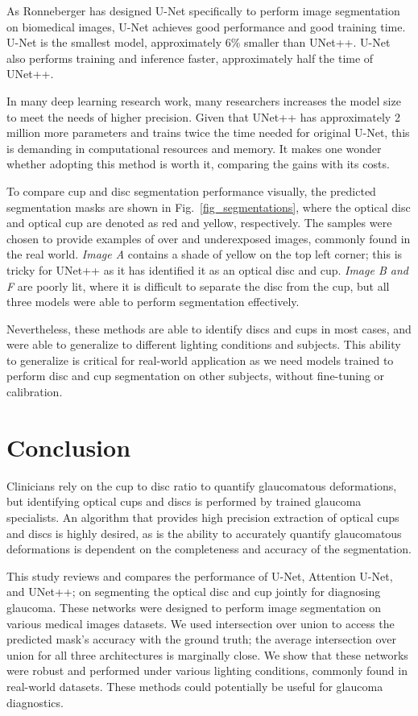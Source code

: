 \documentclass[conference]{IEEEtran}
\begin{document}
As Ronneberger has designed U-Net specifically to perform image segmentation on biomedical images, U-Net achieves good performance and good training time. U-Net is the smallest model, approximately 6\% smaller than UNet++. U-Net also performs training and inference faster, approximately half the time of UNet++.

In many deep learning research work, many researchers increases the model size to meet the needs of higher precision. Given that UNet++ has approximately 2 million more parameters and trains twice the time needed for original U-Net, this is demanding in computational resources and memory. It makes one wonder whether adopting this method is worth it, comparing the gains with its costs. 

To compare cup and disc segmentation performance visually, the predicted segmentation masks are shown in Fig.~\ref{fig_segmentations}, where the optical disc and optical cup are denoted as red and yellow, respectively. The samples were chosen to provide examples of over and underexposed images, commonly found in the real world. \textit{Image A} contains a shade of yellow on the top left corner; this is tricky for UNet++ as it has identified it as an optical disc and cup. \textit{Image B and F} are poorly lit, where it is difficult to separate the disc from the cup, but all three models were able to perform segmentation effectively. 

Nevertheless, these methods are able to identify discs and cups in most cases, and were able to generalize to different lighting conditions and subjects. This ability to generalize is critical for real-world application as we need models trained to perform disc and cup segmentation on other subjects, without fine-tuning or calibration.

\section{Conclusion}

Clinicians rely on the cup to disc ratio to quantify glaucomatous deformations, but identifying optical cups and discs is performed by trained glaucoma specialists. An algorithm that provides high precision extraction of optical cups and discs is highly desired, as is the ability to accurately quantify glaucomatous deformations is dependent on the completeness and accuracy of the segmentation.

This study reviews and compares the performance of U-Net, Attention U-Net, and UNet++; on segmenting the optical disc and cup jointly for diagnosing glaucoma. These networks were designed to perform image segmentation on various medical images datasets. We used intersection over union to access the predicted mask's accuracy with the ground truth; the average intersection over union for all three architectures is marginally close. We show that these networks were robust and performed under various lighting conditions, commonly found in real-world datasets. These methods could potentially be useful for glaucoma diagnostics. 
  


\end{document}
